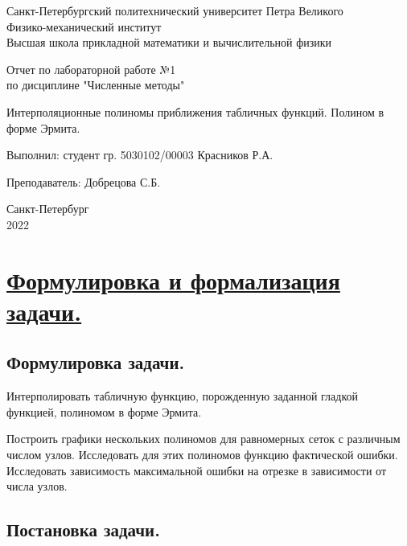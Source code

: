 \documentclass[a4paper, 12pt]{article}
\begin{document}
	\begin{titlepage}
		\begin{center}
			Санкт-Петербургский политехнический университет Петра Великого \\ Физико-механический институт \\ Высшая школа прикладной математики и вычислительной физики
		\end{center}
		\vspace{10em}
		\begin{center}
			\Large Отчет по лабораторной работе №1 \\ по дисциплине "Численные методы"
		\end{center}
		\vspace{1em}
		\begin{center}
			\Huge Интерполяционные полиномы приближения табличных функций. Полином в форме Эрмита.
		\end{center}
		\vspace{15em}
		{\Large 
			
			Выполнил: студент гр. 5030102/00003 Красников Р.А.
			\vspace{1em}
			
			Преподаватель: Добрецова С.Б.}
		\vspace{\fill}
		\begin{center}
			Санкт-Петербург \\ 2022
		\end{center}
	\end{titlepage}
	\newpage
	
	\section{\underline{Формулировка и формализация задачи.}}
	
	\subsection{Формулировка задачи.}
	
	Интерполировать табличную функцию, порожденную заданной гладкой функцией, полиномом в форме Эрмита.
	
	Построить графики нескольких полиномов для равномерных сеток с различным числом узлов. Исследовать для этих полиномов функцию фактической ошибки. Исследовать зависимость максимальной ошибки на отрезке в зависимости от числа узлов.
	
	\subsection{Постановка задачи.}
	
\end{document}

